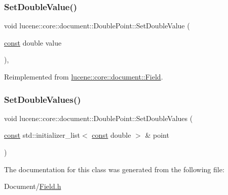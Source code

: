 \subsubsection{\texorpdfstring{Set\+Double\+Value()}{SetDoubleValue()}}
{\footnotesize\ttfamily void lucene\+::core\+::document\+::\+Double\+Point\+::\+Set\+Double\+Value (\begin{DoxyParamCaption}\item[{\mbox{\hyperlink{ZlibCrc32_8h_a2c212835823e3c54a8ab6d95c652660e}{const}} double}]{value }\end{DoxyParamCaption})\hspace{0.3cm}{\ttfamily [inline]}, {\ttfamily [virtual]}}



Reimplemented from \mbox{\hyperlink{classlucene_1_1core_1_1document_1_1Field_a8db791d4d1ebf77288d8529214413810}{lucene\+::core\+::document\+::\+Field}}.

\mbox{\label{classlucene_1_1core_1_1document_1_1DoublePoint_afcc80550e3b4ca606c601304782c1998}} 
\subsubsection{\texorpdfstring{Set\+Double\+Values()}{SetDoubleValues()}}
{\footnotesize\ttfamily void lucene\+::core\+::document\+::\+Double\+Point\+::\+Set\+Double\+Values (\begin{DoxyParamCaption}\item[{\mbox{\hyperlink{ZlibCrc32_8h_a2c212835823e3c54a8ab6d95c652660e}{const}} std\+::initializer\+\_\+list$<$ \mbox{\hyperlink{ZlibCrc32_8h_a2c212835823e3c54a8ab6d95c652660e}{const}} double $>$ \&}]{point }\end{DoxyParamCaption})\hspace{0.3cm}{\ttfamily [inline]}}



The documentation for this class was generated from the following file\+:\begin{DoxyCompactItemize}
\item 
Document/\mbox{\hyperlink{Document_2Field_8h}{Field.\+h}}\end{DoxyCompactItemize}
